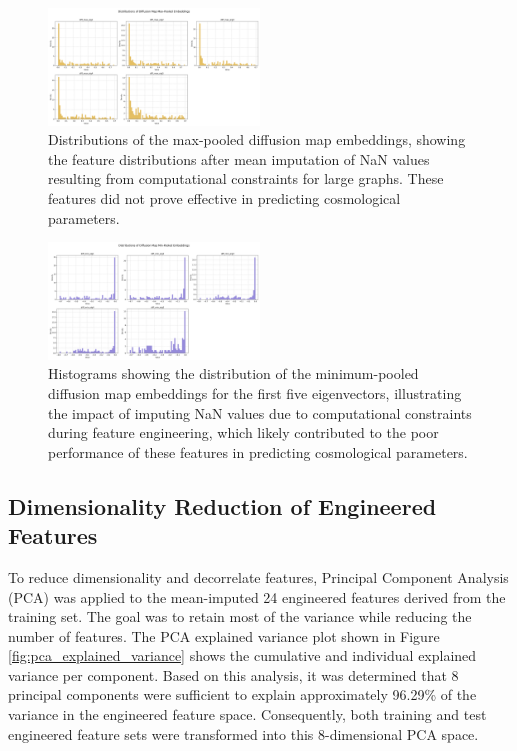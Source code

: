 \documentclass[twocolumn]{aastex631}
\begin{document}
\begin{figure}[h!]
    \centering
    \includegraphics[width=0.5\textwidth]{../input_files/plots/engineered_feature_dist_diff_max_4_20250527-135752.png}
    \caption{Distributions of the max-pooled diffusion map embeddings, showing the feature distributions after mean imputation of NaN values resulting from computational constraints for large graphs. These features did not prove effective in predicting cosmological parameters.}
    \label{fig:diffusion_feature_dist}
\end{figure}

\begin{figure}[h!]
    \centering
    \includegraphics[width=0.5\textwidth]{../input_files/plots/engineered_feature_dist_diff_min_5_20250527-135752.png}
    \caption{Histograms showing the distribution of the minimum-pooled diffusion map embeddings for the first five eigenvectors, illustrating the impact of imputing NaN values due to computational constraints during feature engineering, which likely contributed to the poor performance of these features in predicting cosmological parameters.}
    \label{fig:diffusion_feature_dist_min}
\end{figure}

\subsection{Dimensionality Reduction of Engineered Features}

To reduce dimensionality and decorrelate features, Principal Component Analysis (PCA) was applied to the mean-imputed 24 engineered features derived from the training set. The goal was to retain most of the variance while reducing the number of features. The PCA explained variance plot shown in Figure \ref{fig:pca_explained_variance} shows the cumulative and individual explained variance per component. Based on this analysis, it was determined that 8 principal components were sufficient to explain approximately 96.29\% of the variance in the engineered feature space. Consequently, both training and test engineered feature sets were transformed into this 8-dimensional PCA space.
\end{document}
